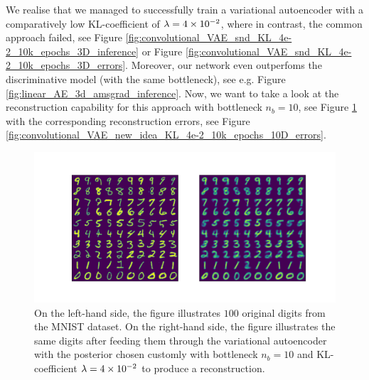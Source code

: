 We realise that we managed to successfully train a variational autoencoder with a comparatively low KL-coefficient of $\lambda=\num{4e-2}$, where in contrast, the common approach failed, see Figure \ref{fig:convolutional_VAE_snd_KL_4e-2_10k_epochs_3D_inference} or Figure \ref{fig:convolutional_VAE_snd_KL_4e-2_10k_epochs_3D_errors}. Moreover, our network even outperfoms the discriminative model (with the same bottleneck), see e.g. Figure \ref{fig:linear_AE_3d_amsgrad_inference}. Now, we want to take a look at the reconstruction capability for this approach with bottleneck $n_b=10$, see Figure \ref{fig:convolutional_VAE_new_idea_KL_4e-2_10k_epochs_10D_inference} with the corresponding reconstruction errors, see Figure \ref{fig:convolutional_VAE_new_idea_KL_4e-2_10k_epochs_10D_errors}.

\begin{figure}
\begin{center}
      \includegraphics[trim = 15mm 10mm 15mm 15mm, clip, width=\linewidth]{convolutional_VAE_new_idea_KL_4e-2_10k_epochs_10D_inference}
\end{center}
\caption{On the left-hand side, the figure illustrates $100$ original digits from the MNIST dataset. On the right-hand side, the figure illustrates the same digits after feeding them through the variational autoencoder with the posterior chosen customly with bottleneck $n_b=10$ and KL-coefficient $\lambda=\num{4e-2}$ to produce a reconstruction.}\label{fig:convolutional_VAE_new_idea_KL_4e-2_10k_epochs_10D_inference}
\end{figure}


